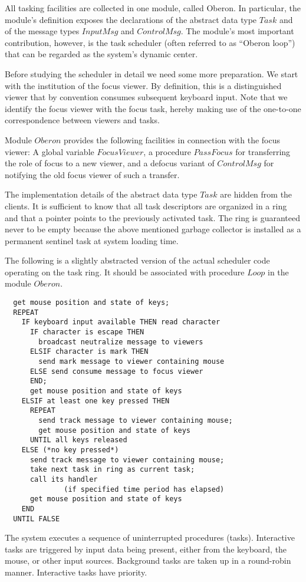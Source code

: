 All tasking facilities are collected in one module, called Oberon. In particular, the
module's definition exposes the declarations of the abstract data type $Task$ and of the message
types $InputMsg$ and $ControlMsg$. The module's most important contribution, however, is the task
scheduler (often referred to as “Oberon loop”) that can be regarded as the system's dynamic center.

Before studying the scheduler in detail we need some more preparation. We start with the
institution of the focus viewer. By definition, this is a distinguished viewer that by convention
consumes subsequent keyboard input. Note that we identify the focus viewer with the focus task,
hereby making use of the one-to-one correspondence between viewers and tasks.

Module $Oberon$ provides the following facilities in connection with the focus viewer: A global
variable $FocusViewer$, a procedure $PassFocus$ for transferring the role of focus to a new viewer,
and a defocus variant of $ControlMsg$ for notifying the old focus viewer of such a transfer.

The implementation details of the abstract data type $Task$ are hidden from the clients. It is
sufficient to know that all task descriptors are organized in a ring and that a pointer points to the
previously activated task. The ring is guaranteed never to be empty because the above mentioned
garbage collector is installed as a permanent sentinel task at system loading time.

The following is a slightly abstracted version of the actual scheduler code operating on the task
ring. It should be associated with procedure $Loop$ in the module $Oberon$.
\begin{verbatim}
  get mouse position and state of keys;
  REPEAT
    IF keyboard input available THEN read character
      IF character is escape THEN
        broadcast neutralize message to viewers
      ELSIF character is mark THEN
        send mark message to viewer containing mouse
      ELSE send consume message to focus viewer
      END;
      get mouse position and state of keys
    ELSIF at least one key pressed THEN
      REPEAT
        send track message to viewer containing mouse;
        get mouse position and state of keys
      UNTIL all keys released
    ELSE (*no key pressed*)
      send track message to viewer containing mouse;
      take next task in ring as current task;
      call its handler
              (if specified time period has elapsed)
      get mouse position and state of keys
    END 
  UNTIL FALSE
\end{verbatim}
The system executes a sequence of uninterrupted procedures (tasks). Interactive tasks are
triggered by input data being present, either from the keyboard, the mouse, or other input sources.
Background tasks are taken up in a round-robin manner. Interactive tasks have priority.

